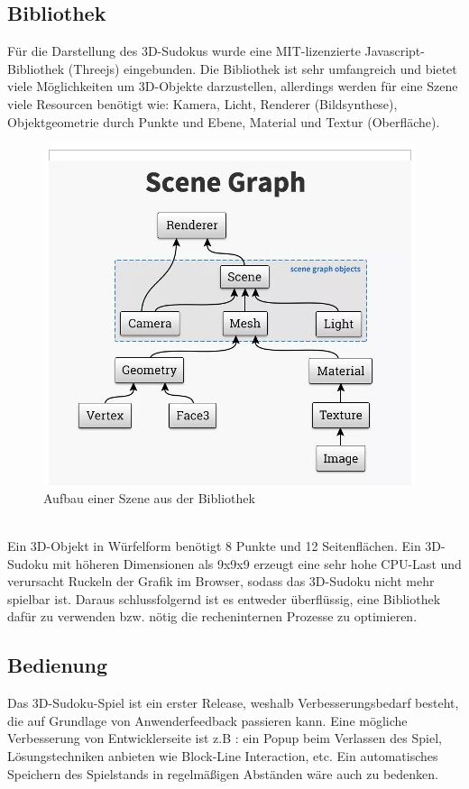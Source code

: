 \documentclass[a4paper,12pt]{scrreprt}
\begin{document}
	\subsection{Bibliothek}
	F\"ur die Darstellung des 3D-Sudokus wurde eine MIT-lizenzierte Javascript-Bibliothek (Threejs) eingebunden.
	Die Bibliothek ist sehr umfangreich und bietet viele M\"oglichkeiten um 3D-Objekte darzustellen,
	allerdings werden f\"ur eine Szene viele Resourcen ben\"otigt wie: Kamera, Licht, Renderer (Bildsynthese),
	Objektgeometrie durch Punkte und Ebene, Material und Textur (Oberfl\"ache). 
	\begin{figure}[h]
		\includegraphics[scale=0.7]{pictures/Sceneoverview}
		\caption{Aufbau einer Szene aus der Bibliothek}
	\end{figure}\medskip \\
	Ein 3D-Objekt in W\"urfelform ben\"otigt 8 Punkte und 12 Seitenfl\"achen.
	Ein 3D-Sudoku mit h\"oheren Dimensionen als 9x9x9 erzeugt eine sehr hohe CPU-Last und verursacht Ruckeln
	der Grafik im Browser, sodass das 3D-Sudoku nicht mehr spielbar ist.
	Daraus schlussfolgernd ist es entweder \"uberfl\"ussig, eine Bibliothek daf\"ur zu verwenden bzw. n\"otig
	die recheninternen Prozesse zu optimieren.
	\subsection{Bedienung}
	Das 3D-Sudoku-Spiel ist ein erster Release, weshalb Verbesserungsbedarf besteht, die auf Grundlage von
	Anwenderfeedback passieren kann. Eine m\"ogliche Verbesserung von Entwicklerseite ist z.B : ein Popup beim
	Verlassen des Spiel, L\"osungstechniken anbieten wie Block-Line Interaction, etc.
	Ein automatisches Speichern des Spielstands in regelm\"a{\ss}igen Abst\"anden w\"are auch zu bedenken.
	
\end{document}
